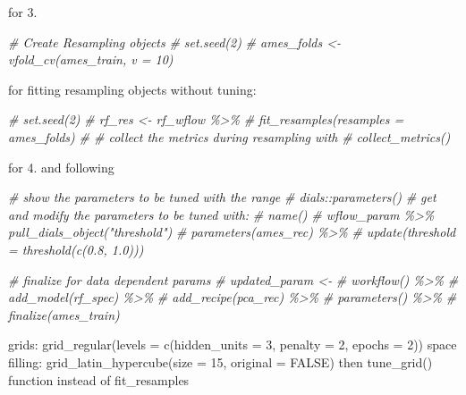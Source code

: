 \documentclass[
]{book}
\newenvironment{Shaded}{\begin{snugshade}}{\end{snugshade}}
\newcommand{\CommentTok}[1]{\textcolor[rgb]{0.56,0.35,0.01}{\textit{#1}}}
\begin{document}
for 3.

\begin{Shaded}
\begin{Highlighting}[]
\CommentTok{\# Create Resampling objects}
\CommentTok{\# set.seed(2)}
\CommentTok{\# ames\_folds \textless{}{-} vfold\_cv(ames\_train, v = 10)}
\end{Highlighting}
\end{Shaded}

for fitting resampling objects without tuning:

\begin{Shaded}
\begin{Highlighting}[]
\CommentTok{\# set.seed(2)}
\CommentTok{\# rf\_res \textless{}{-} rf\_wflow \%\textgreater{}\% }
\CommentTok{\#   fit\_resamples(resamples = ames\_folds)}
\CommentTok{\# \# collect the metrics during resampling with}
\CommentTok{\# collect\_metrics()}
\end{Highlighting}
\end{Shaded}

for 4. and following

\begin{Shaded}
\begin{Highlighting}[]
\CommentTok{\# show the parameters to be tuned with the range}
\CommentTok{\# dials::parameters()}
\CommentTok{\# get and modify the parameters to be tuned with:}
\CommentTok{\# name()}
\CommentTok{\# wflow\_param \%\textgreater{}\% pull\_dials\_object("threshold")}
\CommentTok{\# parameters(ames\_rec) \%\textgreater{}\% }
\CommentTok{\#  update(threshold = threshold(c(0.8, 1.0)))}

\CommentTok{\# finalize for data dependent params}
\CommentTok{\# updated\_param \textless{}{-} }
\CommentTok{\#   workflow() \%\textgreater{}\% }
\CommentTok{\#   add\_model(rf\_spec) \%\textgreater{}\% }
\CommentTok{\#   add\_recipe(pca\_rec) \%\textgreater{}\% }
\CommentTok{\#   parameters() \%\textgreater{}\% }
\CommentTok{\#   finalize(ames\_train)}
\end{Highlighting}
\end{Shaded}

grids: grid\_regular(levels = c(hidden\_units = 3, penalty = 2, epochs = 2)) space filling: grid\_latin\_hypercube(size = 15, original = FALSE) then tune\_grid() function instead of fit\_resamples
\end{document}
